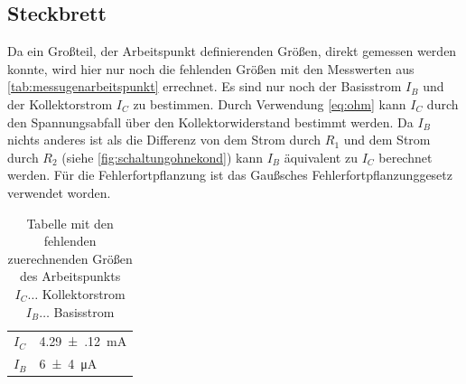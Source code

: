 \documentclass[12pt,english,ngerman]{scrartcl}
\begin{document}
\subsection{Steckbrett}



Da ein Großteil, der Arbeitspunkt definierenden Größen, direkt gemessen werden
konnte, wird hier nur noch die fehlenden Größen mit den Messwerten aus
\autoref{tab:messugenarbeitspunkt} errechnet. Es sind nur noch der Basisstrom
$I_B$ und der Kollektorstrom $I_C$ zu bestimmen. Durch Verwendung
\autoref{eq:ohm} kann $I_C$ durch den Spannungsabfall über den
Kollektorwiderstand bestimmt werden. Da $I_B$ nichts anderes ist als die
Differenz von dem Strom durch $R_1$ und dem Strom durch $R_2$ (siehe
\autoref{fig:schaltungohnekond}) kann $I_B$ äquivalent zu $I_C$ berechnet
werden. Für die Fehlerfortpflanzung ist das Gaußsches Fehlerfortpflanzunggesetz
verwendet worden.

\begin{table}[H]
  \caption{ Tabelle mit den fehlenden zuerechnenden Größen des Arbeitspunkts \\
  $I_C \dots$ Kollektorstrom \\
  $I_B \dots$ Basisstrom 
  }
  \label{tab:aus_arbeitspunkt_daten}
  \centering
  \begin{tabular}[c]{l|l}
    $I_C$ & \SI{4.29(12)}{\milli\ampere} \\
    $I_B$ & \SI{6(4)}{\micro\ampere} \\
  \end{tabular}
\end{table}


\end{document}
